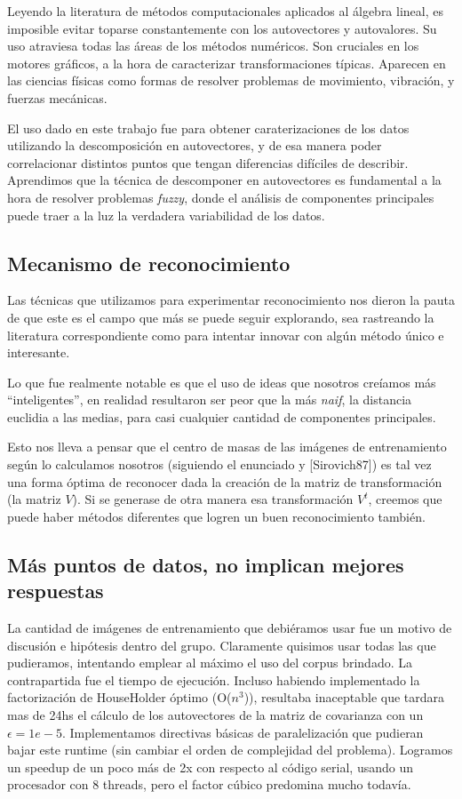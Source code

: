 Leyendo la literatura de m\'etodos computacionales aplicados al \'algebra lineal, es
imposible evitar toparse constantemente con los autovectores y autovalores. Su
uso atraviesa todas las \'areas de los m\'etodos num\'ericos. Son cruciales
en los motores gr\'aficos, a la hora de caracterizar transformaciones t\'ipicas.
Aparecen en las ciencias f\'isicas como formas de resolver problemas de movimiento,
vibraci\'on, y fuerzas mec\'anicas.

El uso dado en este trabajo fue para obtener caraterizaciones de los datos utilizando la
descomposici\'on en autovectores, y de esa manera poder correlacionar distintos puntos que
tengan diferencias dif\'iciles de describir. Aprendimos que la t\'ecnica de descomponer en autovectores
es fundamental a la hora de resolver problemas \textit{fuzzy}, donde
el an\'alisis de componentes principales puede traer a la luz la verdadera variabilidad de los datos.


\subsection{Mecanismo de reconocimiento}

Las t\'ecnicas que utilizamos para experimentar reconocimiento nos dieron
la pauta de que este es el campo que m\'as se puede seguir explorando, sea rastreando la literatura
correspondiente como para intentar innovar con alg\'un m\'etodo \'unico e interesante.

Lo que fue realmente notable es que el uso de ideas que nosotros cre\'iamos m\'as ``inteligentes'',
en realidad resultaron ser peor que la m\'as \textit{naif}, la distancia euclidia a las medias, para
casi cualquier cantidad de componentes principales.

Esto nos lleva a pensar que el centro de masas de las im\'agenes de entrenamiento seg\'un lo calculamos
nosotros (siguiendo el enunciado y [Sirovich87]) es tal vez una forma \'optima de reconocer
dada la creaci\'on de la matriz de transformaci\'on (la matriz $V$). Si se generase de otra manera esa
transformaci\'on $V^t$, creemos que puede haber m\'etodos diferentes que logren un buen reconocimiento tambi\'en.


\subsection{M\'as puntos de datos, no implican mejores respuestas}

La cantidad de im\'agenes de entrenamiento que debi\'eramos usar fue un motivo de
discusi\'on e hip\'otesis dentro del grupo.
Claramente quisimos usar todas las que pudieramos, intentando emplear al m\'aximo el
uso del corpus brindado. La contrapartida fue el tiempo de ejecuci\'on. Incluso habiendo implementado
la factorizaci\'on de HouseHolder \'optimo (O($n^3$)), resultaba inaceptable que tardara mas de 24hs
el c\'alculo de los autovectores de la matriz de covarianza con un $\epsilon = 1e-5$. Implementamos 
directivas b\'asicas de paralelizaci\'on que pudieran bajar este runtime (sin cambiar el orden de complejidad del problema).
Logramos un speedup de un poco m\'as de 2x con respecto al c\'odigo serial, usando
un procesador con 8 threads, pero el factor c\'ubico predomina mucho todav\'ia.

